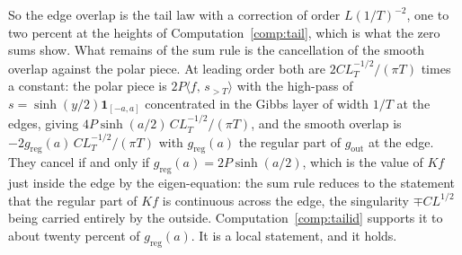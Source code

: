 \documentclass[11pt]{article}
\theoremstyle{definition}
\theoremstyle{remark}
\newcommand{\ip}[2]{\langle #1,\, #2\rangle}
\begin{document}
So the edge overlap is the tail law with a correction of order $L(1/T)^{-2}$, one to two percent at the heights of Computation~\ref{comp:tail}, which is what the zero sums show. What remains of the sum rule is the cancellation of the smooth overlap against the polar piece. At leading order both are $2CL_T^{-1/2}/(\pi T)$ times a constant: the polar piece is $2P\ip{f}{s_{>T}}$ with the high-pass of $s=\sinh(y/2)\mathbf 1_{[-a,a]}$ concentrated in the Gibbs layer of width $1/T$ at the edges, giving $4P\sinh(a/2)\,CL_T^{-1/2}/(\pi T)$, and the smooth overlap is $-2g_{\mathrm{reg}}(a)\,CL_T^{-1/2}/(\pi T)$ with $g_{\mathrm{reg}}(a)$ the regular part of $g_{\mathrm{out}}$ at the edge. They cancel if and only if $g_{\mathrm{reg}}(a)=2P\sinh(a/2)$, which is the value of $Kf$ just inside the edge by the eigen-equation: the sum rule reduces to the statement that the regular part of $Kf$ is continuous across the edge, the singularity $\mp CL^{1/2}$ being carried entirely by the outside. Computation~\ref{comp:tailid} supports it to about twenty percent of $g_{\mathrm{reg}}(a)$. It is a local statement, and it holds.
\end{document}

